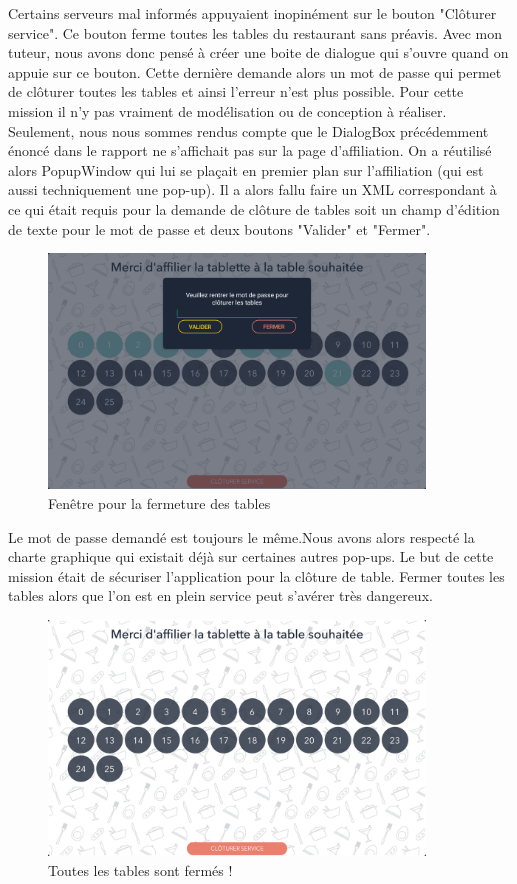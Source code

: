 Certains serveurs mal informés appuyaient inopinément sur le bouton "Clôturer service". Ce bouton ferme toutes les tables du restaurant sans préavis. Avec mon tuteur, nous avons donc pensé à créer une boite de dialogue qui s'ouvre quand on appuie sur ce bouton. Cette dernière demande alors un mot de passe qui permet de clôturer toutes les tables et ainsi l'erreur n'est plus possible. Pour cette mission il n'y pas vraiment de modélisation ou de conception à réaliser. Seulement, nous nous sommes rendus compte que le DialogBox précédemment énoncé dans le rapport ne s'affichait pas sur la page d'affiliation. On a réutilisé alors PopupWindow qui lui se plaçait en premier plan sur l'affiliation (qui est aussi techniquement une pop-up). Il a alors fallu faire un XML correspondant à ce qui était requis pour la demande de clôture de tables soit un champ d'édition de texte pour le mot de passe et deux boutons "Valider" et "Fermer".

\begin{figure}[!htb]
  \centering
  \includegraphics[width=100mm,scale=0.5]{images/cloture_table.png}
  \caption{Fenêtre pour la fermeture des tables}
  \label{fig:boat1}
\end{figure}

Le mot de passe demandé est toujours le même.Nous avons alors respecté la charte graphique qui existait déjà sur certaines autres pop-ups. Le but de cette mission était de sécuriser l'application pour la clôture de table. Fermer toutes les tables alors que l'on est en plein service peut s'avérer très dangereux.

\begin{figure}[!htb]
  \centering
  \includegraphics[width=100mm,scale=0.5]{images/cloture_table2.png}
  \caption{Toutes les tables sont fermés !}
  \label{fig:boat1}
\end{figure}


